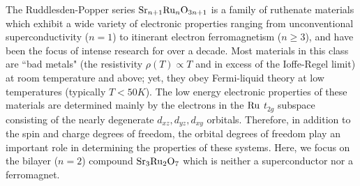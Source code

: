 \documentclass[prb,aps,amssymb,showpacs,twocolumn,amsmath,floatfix]{revtex4}
\begin{document}
The Ruddlesden-Popper series ${\rm Sr}_{n+1}{\rm Ru}_n{\rm O}_{3n +1}$ is a family 
of ruthenate materials which exhibit a wide variety of electronic properties ranging from 
unconventional superconductivity ($n=1$) to itinerant electron ferromagnetism ($n \ge 3 $), and 
have been the focus of intense research for over a decade\cite{Mackenzie2003, Bergemann2003, Ovchinnikov2003}.  Most materials in this class are 
``bad metals\cite{Emery1994}" (the resistivity $\rho(T) \propto T$ and in excess of the Ioffe-Regel limit) at room temperature and above; yet, they obey Fermi-liquid
 theory at low temperatures (typically $T < 50 K$).  The low energy electronic 
 properties of these materials are determined mainly by the electrons in the ${\rm Ru}$ $t_{2g}$ 
 subspace consisting of the nearly degenerate $d_{xz},d_{yz},d_{xy}$ 
 orbitals.  Therefore, in addition to the spin and charge degrees of freedom, the orbital 
 degrees of freedom play an important role in determining the properties of these systems.
  Here, we focus on  the bilayer ($n=2$) compound 
 ${\rm Sr}_3{\rm Ru}_2{\rm O}_7$ which
 is neither a superconductor nor a ferromagnet.
\end{document}
